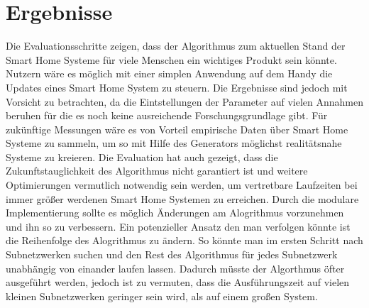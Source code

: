 \section{Ergebnisse}
Die Evaluationsschritte zeigen, dass der Algorithmus zum aktuellen Stand der Smart Home Systeme für viele Menschen ein wichtiges Produkt sein könnte.
Nutzern wäre es möglich mit einer simplen Anwendung auf dem Handy die Updates eines Smart Home System zu steuern.
Die Ergebnisse sind jedoch mit Vorsicht zu betrachten, da die Eintstellungen der Parameter auf vielen Annahmen beruhen für die es noch
keine ausreichende Forschungsgrundlage gibt. Für zukünftige Messungen wäre es von Vorteil empirische Daten über Smart Home Systeme
zu sammeln, um so mit Hilfe des Generators möglichst realitätsnahe Systeme zu kreieren.
Die Evaluation hat auch gezeigt, dass die Zukunftstauglichkeit des Algorithmus nicht garantiert ist und weitere Optimierungen vermutlich
notwendig sein werden, um vertretbare Laufzeiten bei immer größer werdenen Smart Home Systemen zu erreichen. Durch die modulare
Implementierung sollte es möglich Änderungen am Alogrithmus vorzunehmen und ihn so zu verbessern.
Ein potenzieller Ansatz den man verfolgen könnte ist die Reihenfolge des Alogrithmus zu ändern. So könnte man im ersten Schritt nach Subnetzwerken
suchen und den Rest des Algorithmus für jedes Subnetzwerk unabhängig von einander laufen lassen. Dadurch müsste der Algorthmus öfter ausgeführt werden,
jedoch ist zu vermuten, dass  die Ausführungszeit auf vielen kleinen Subnetzwerken geringer sein wird, als auf einem großen System.













  










